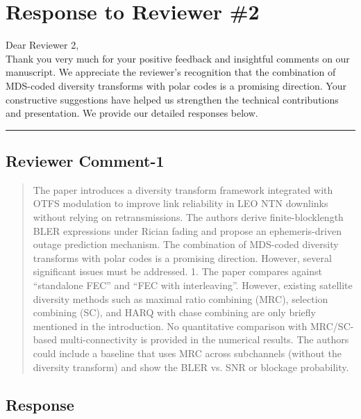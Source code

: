 \section{Response to Reviewer \#2}

Dear Reviewer 2,\\

Thank you very much for your positive feedback and insightful comments on our manuscript. We appreciate the reviewer's recognition that the combination of MDS-coded diversity transforms with polar codes is a promising direction. Your constructive suggestions have helped us strengthen the technical contributions and presentation. We provide our detailed responses below.

\noindent\rule{17cm}{2.0pt}

\subsection{Reviewer Comment-1}



\begin{mdframed}
\begin{quote}

The paper introduces a diversity transform framework integrated with OTFS modulation to improve link reliability in LEO NTN downlinks without relying on retransmissions. The authors derive finite-blocklength BLER expressions under Rician fading and propose an ephemeris-driven outage prediction mechanism. The combination of MDS-coded diversity transforms with polar codes is a promising direction. However, several significant issues must be addressed.
1. The paper compares against “standalone FEC” and “FEC with interleaving”. However, existing satellite diversity methods such as maximal ratio combining (MRC), selection combining (SC), and HARQ with chase combining are only briefly mentioned in the introduction. No quantitative comparison with MRC/SC-based multi-connectivity is provided in the numerical results. The authors could include a baseline that uses MRC across subchannels (without the diversity transform) and show the BLER vs. SNR or blockage probability.

\end{quote}

\end{mdframed}


\subsection{Response}


